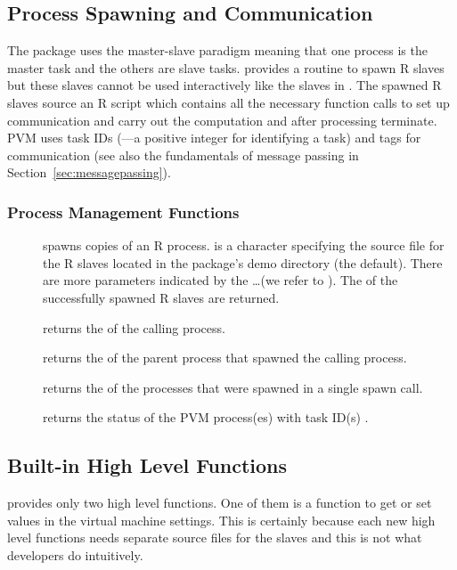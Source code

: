 \subsection{Process Spawning and Communication}

The package  uses the master-slave paradigm meaning that one
process is the master task and the others are slave tasks. 
provides a routine to spawn R slaves but these slaves cannot be used
interactively like the slaves in . The spawned R slaves
source an R script which contains all the necessary function calls to
set up communication and carry out the computation and after
processing terminate.
PVM uses task IDs (---a positive integer for identifying a task)
and tags for communication (see
also the fundamentals of message passing in
Section~\ref{sec:messagepassing}).

\subsubsection{Process Management  Functions}
\begin{description}
\item[] spawns 
  copies of an  R process.  is a character
  specifying the source file for the R slaves located in the package's
  demo directory (the default). There are more
  parameters indicated by the \ldots (we refer to
  \cite{nali07rpvm}). The  of the successfully spawned R
  slaves are returned.
\item[] returns the  of the calling
  process.
\item[] returns the  of the parent
  process that spawned the calling process.
\item[] returns the  of the processes
  that were spawned in a single spawn call.
\item[] returns the status of the PVM
  process(es) with task ID(s) .
\end{description}

\subsection{Built-in High Level Functions}

 provides only two high level functions. One of them is a
function to get or set values in the virtual machine settings. This is
certainly because each new high level functions needs separate source
files for the slaves and this is not what developers do intuitively. 

